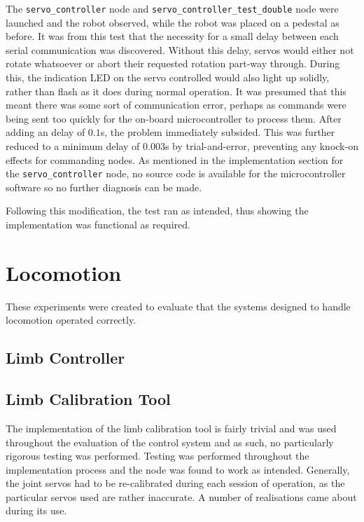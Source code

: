 The \texttt{servo\_controller} node and \texttt{servo\_controller\_test\_double} node were launched and the robot observed, while the robot was placed on a pedestal as before. It was from this test that the necessity for a small delay between each serial communication was discovered. Without this delay, servos would either not rotate whatsoever or abort their requested rotation part-way through. During this, the indication LED on the servo controlled would also light up solidly, rather than flash as it does during normal operation. It was presumed that this meant there was some sort of communication error, perhaps as commands were being sent too quickly for the on-board microcontroller to process them. After adding an delay of $0.1$s, the problem immediately subsided. This was further reduced to a minimum delay of $0.003$s by trial-and-error, preventing any knock-on effects for commanding nodes. As mentioned in the implementation section for the \texttt{servo\_controller} node, no source code is available for the microcontroller software so no further diagnosis can be made. 

Following this modification, the test ran as intended, thus showing the implementation was functional as required.

\section{Locomotion}

These experiments were created to evaluate that the systems designed to handle locomotion operated correctly.

\subsection{Limb Controller}

\subsection{Limb Calibration Tool}

The implementation of the limb calibration tool is fairly trivial and was used throughout the evaluation of the control system and as such, no particularly rigorous testing was performed. Testing was performed throughout the implementation process and the node was found to work as intended. Generally, the joint servos had to be re-calibrated during each session of operation, as the particular servos used are rather inaccurate. A number of realisations came about during its use.

